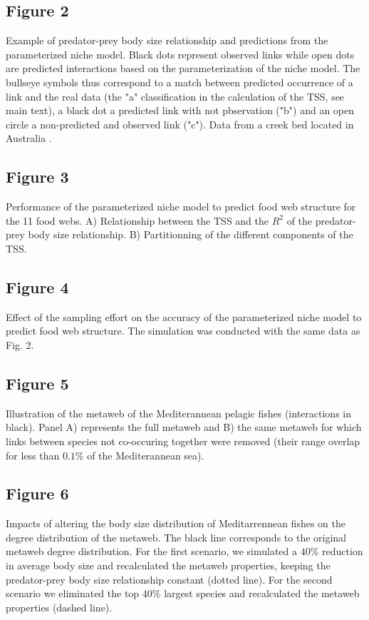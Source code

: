 \documentclass[12pt]{article}
\begin{document}
\subsection*{Figure 2}
Example of predator-prey body size relationship and predictions from the parameterized niche model. Black dots represent observed links while open dots are predicted interactions based on the parameterization of the niche model. The bullseye symbols thus correspond to a match between predicted occurrence of a link and the real data (the "a" classification in the calculation of the TSS, see main text), a black dot a predicted link with not pbservation ("b") and an open circle a non-predicted and observed link ("c"). Data from a creek bed located in Australia \parencite{Brose2005}. 

\subsection*{Figure 3}
Performance of the parameterized niche model to predict food web structure for the 11 food webs. A) Relationship between the TSS and the $R^2$ of the predator-prey body size relationship. B) Partitionning of the different components of the TSS.  	

\subsection*{Figure 4}
Effect of the sampling effort on the accuracy of the parameterized niche model to predict food web structure. The simulation was conducted with the same data as Fig. 2.

\subsection*{Figure 5}
Illustration of the metaweb of the Mediterannean pelagic fishes (interactions in black). Panel A) represents the full metaweb and B) the same metaweb for which links between species not co-occuring together were removed (their range overlap for less than $0.1\%$ of the Mediterannean sea). 

\subsection*{Figure 6}
Impacts of altering the body size distribution of Meditarrennean fishes on the degree distribution of the metaweb. The black line corresponds to the original metaweb degree distribution. For the first scenario, we simulated a $40\%$ reduction in average body size and recalculated the metaweb properties, keeping the predator-prey body size relationship constant (dotted line). For the second scenario we eliminated the top $40\%$ largest species and recalculated the metaweb properties (dashed line).   
\end{document}
